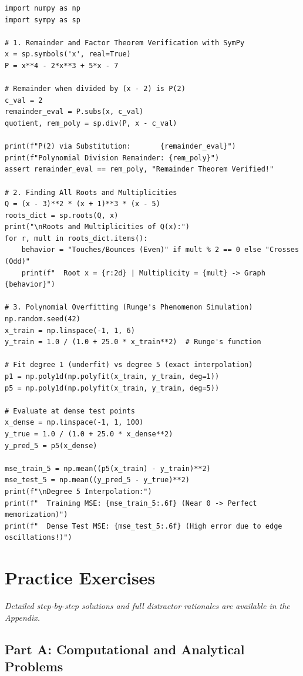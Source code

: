 \begin{lstlisting}[caption={Polynomial Algebra and Overfitting Diagnostics in Python}]
import numpy as np
import sympy as sp

# 1. Remainder and Factor Theorem Verification with SymPy
x = sp.symbols('x', real=True)
P = x**4 - 2*x**3 + 5*x - 7

# Remainder when divided by (x - 2) is P(2)
c_val = 2
remainder_eval = P.subs(x, c_val)
quotient, rem_poly = sp.div(P, x - c_val)

print(f"P(2) via Substitution:       {remainder_eval}")
print(f"Polynomial Division Remainder: {rem_poly}")
assert remainder_eval == rem_poly, "Remainder Theorem Verified!"

# 2. Finding All Roots and Multiplicities
Q = (x - 3)**2 * (x + 1)**3 * (x - 5)
roots_dict = sp.roots(Q, x)
print("\nRoots and Multiplicities of Q(x):")
for r, mult in roots_dict.items():
    behavior = "Touches/Bounces (Even)" if mult % 2 == 0 else "Crosses (Odd)"
    print(f"  Root x = {r:2d} | Multiplicity = {mult} -> Graph {behavior}")

# 3. Polynomial Overfitting (Runge's Phenomenon Simulation)
np.random.seed(42)
x_train = np.linspace(-1, 1, 6)
y_train = 1.0 / (1.0 + 25.0 * x_train**2)  # Runge's function

# Fit degree 1 (underfit) vs degree 5 (exact interpolation)
p1 = np.poly1d(np.polyfit(x_train, y_train, deg=1))
p5 = np.poly1d(np.polyfit(x_train, y_train, deg=5))

# Evaluate at dense test points
x_dense = np.linspace(-1, 1, 100)
y_true = 1.0 / (1.0 + 25.0 * x_dense**2)
y_pred_5 = p5(x_dense)

mse_train_5 = np.mean((p5(x_train) - y_train)**2)
mse_test_5 = np.mean((y_pred_5 - y_true)**2)
print(f"\nDegree 5 Interpolation:")
print(f"  Training MSE: {mse_train_5:.6f} (Near 0 -> Perfect memorization)")
print(f"  Dense Test MSE: {mse_test_5:.6f} (High error due to edge oscillations!)")
\end{lstlisting}

\newpage
\section{Practice Exercises}
\textit{Detailed step-by-step solutions and full distractor rationales are available in the Appendix.}

\subsection*{Part A: Computational and Analytical Problems}

